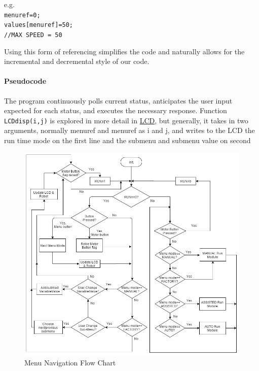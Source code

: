 	e.g.\\
	\texttt{menu\textunderscore ref=0;\\values[menu\textunderscore ref]=50;\\//MAX SPEED = 50}
	
	Using this form of referencing simplifies the code and naturally allows for the incremental and decremental style of our code.
	
	\paragraph{Pseudocode}
		The program continuously polls current status, anticipates the user input expected for each status, and executes the necessary response. Function \texttt{LCD\textunderscore disp(i,j)} is explored in more detail in \underline{LCD}, but generally, it takes in two arguments, normally menu\textunderscore ref and menu\textunderscore ref as i and j, and writes to the LCD the run time mode on the first line and the submenu and submenu value on second\\
		
		
		
			\begin{figure}[h]
				\includegraphics[scale=0.45]{menu_navFlowChart.png}
				\centering
				\caption{Menu Navigation Flow Chart}
			\end{figure}
	
	
	

	
	
	
	

